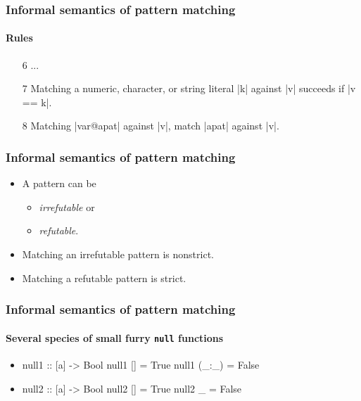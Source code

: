 \documentclass{beamer}
\begin{document}
\begin{frame}[fragile]
  \frametitle{Informal semantics of pattern matching}
  \framesubtitle{Rules}

  \begin{enumerate}
  \item[6]
    ...
  \item[7]
    Matching a numeric, character, or string literal |k| against |v|
    succeeds if |v == k|.
  \item[8]
    Matching |var@apat| against |v|, match |apat| against |v|.
  \end{enumerate}
\end{frame}


\begin{frame}
  \frametitle{Informal semantics of pattern matching}

  \begin{itemize}
  \item
    A pattern can be
    \begin{itemize}
    \item
      \emph{irrefutable} or
    \item
      \emph{refutable}.
    \end{itemize}
  \item
    Matching an irrefutable pattern is nonstrict.
  \item
    Matching a refutable pattern is strict.
  \end{itemize}
\end{frame}


\begin{frame}[fragile]
  \frametitle{Informal semantics of pattern matching}
  \framesubtitle{Several species of small furry \texttt{null} functions}

  \begin{itemize}
  \item
    \begin{code}
null1 :: [a] -> Bool
null1 []    = True
null1 (_:_) = False
    \end{code}
  \item
    \begin{code}
null2 :: [a] -> Bool
null2 []    = True
null2 _     = False
    \end{code}
  \end{itemize}
\end{frame}
\end{document}

